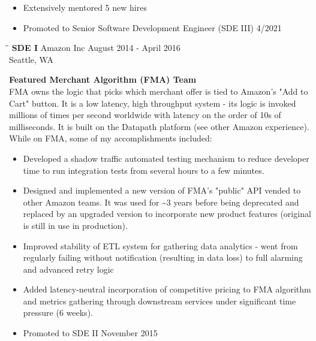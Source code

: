 \documentclass{res}
\begin{document}
\begin{resume}
\begin{itemize}
At the end of 2019, onebox test support was a top feature request from our biggest customers.  Unfortunately, Datapath is not a traditional SOA - rather than deploying each "service" to separate fleets, each is deployed to every host across a single fleet.  This makes even defining what "onebox testing" means difficult in Datapath.  I owned the Customer Onebox project from start to delivery, including gathering requirements from internal customers, design, splitting the project into tasks, assigning those tasks to junior engineers on my team (and of course myself), and partnering with our fleet management team to deploy the new onebox testing fleets.  The first beta customers were onboarded at the end of 2020.  The project is still in beta testing.
   \item Extensively mentored 5 new hires
   \item Promoted to Senior Software Development Engineer (SDE III) 4/2021
   \end{itemize}

   \begin{tabbing}%
   \hspace{2.2in}\= \hspace{2.2in}\= \kill %
   {\bf SDE I}  \> Amazon Inc\> August 2014 - April 2016\\
                          \> Seattle, WA
   \end{tabbing}\vspace{-17pt}
   {\large \bf Featured Merchant Algorithm (FMA) Team}\\
   FMA owns the logic that picks which merchant offer is tied to Amazon's "Add to Cart" button. It is a low latency, high throughput system - its logic is invoked millions of times per second worldwide with latency on the order of 10s of milliseconds.  It is built on the Datapath platform (see other Amazon experience).  While on FMA, some of my accomplishments included:
   \begin{itemize}
   \item Developed a shadow traffic automated testing mechanism to reduce developer time to run integration tests from several hours to a few minutes.
   \item Designed and implemented a new version of FMA's "public" API vended to other Amazon teams.  It was used for \textasciitilde 3 years before being deprecated and replaced by an upgraded version to incorporate new product features (original is still in use in production).
   \item Improved stability of ETL system for gathering data analytics - went from regularly failing without notification (resulting in data loss) to full alarming and advanced retry logic
   \item Added latency-neutral incorporation of competitive pricing to FMA algorithm and metrics gathering through downstream services under significant time pressure (6 weeks).
   \item Promoted to SDE II November 2015
   \end{itemize}
   

\end{resume}
\end{document}
